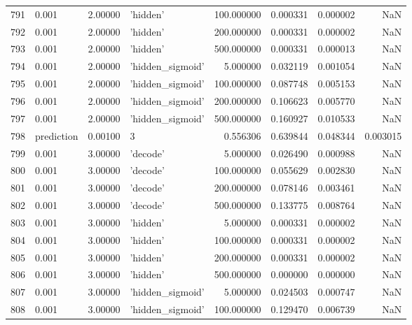 \documentclass[10pt,a4paper]{article}
\begin{document}
\begin{tabular}{llrlrrrr}
791  &       0.001 &   2.00000 &           'hidden' &  100.000000 &  0.000331 &  0.000002 &       NaN \\
792  &       0.001 &   2.00000 &           'hidden' &  200.000000 &  0.000331 &  0.000002 &       NaN \\
793  &       0.001 &   2.00000 &           'hidden' &  500.000000 &  0.000331 &  0.000013 &       NaN \\
794  &       0.001 &   2.00000 &   'hidden\_sigmoid' &    5.000000 &  0.032119 &  0.001054 &       NaN \\
795  &       0.001 &   2.00000 &   'hidden\_sigmoid' &  100.000000 &  0.087748 &  0.005153 &       NaN \\
796  &       0.001 &   2.00000 &   'hidden\_sigmoid' &  200.000000 &  0.106623 &  0.005770 &       NaN \\
797  &       0.001 &   2.00000 &   'hidden\_sigmoid' &  500.000000 &  0.160927 &  0.010533 &       NaN \\
798  &  prediction &   0.00100 &                  3 &    0.556306 &  0.639844 &  0.048344 &  0.003015 \\
799  &       0.001 &   3.00000 &           'decode' &    5.000000 &  0.026490 &  0.000988 &       NaN \\
800  &       0.001 &   3.00000 &           'decode' &  100.000000 &  0.055629 &  0.002830 &       NaN \\
801  &       0.001 &   3.00000 &           'decode' &  200.000000 &  0.078146 &  0.003461 &       NaN \\
802  &       0.001 &   3.00000 &           'decode' &  500.000000 &  0.133775 &  0.008764 &       NaN \\
803  &       0.001 &   3.00000 &           'hidden' &    5.000000 &  0.000331 &  0.000002 &       NaN \\
804  &       0.001 &   3.00000 &           'hidden' &  100.000000 &  0.000331 &  0.000002 &       NaN \\
805  &       0.001 &   3.00000 &           'hidden' &  200.000000 &  0.000331 &  0.000002 &       NaN \\
806  &       0.001 &   3.00000 &           'hidden' &  500.000000 &  0.000000 &  0.000000 &       NaN \\
807  &       0.001 &   3.00000 &   'hidden\_sigmoid' &    5.000000 &  0.024503 &  0.000747 &       NaN \\
808  &       0.001 &   3.00000 &   'hidden\_sigmoid' &  100.000000 &  0.129470 &  0.006739 &       NaN \\

\end{tabular}
\end{document}

